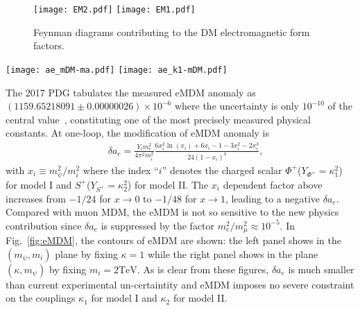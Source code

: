 \documentclass[aps,prd,letterpaper,showpacs,twocolumn,preprintnumbers,floatfix,superscriptaddress]{revtex4-1}
\begin{document}
%
\begin{figure}[t]
\centering
  \texttt{[image: EM2.pdf]}
  \texttt{[image: EM1.pdf]}
\caption{\label{ddloopgamma} Feynman diagrams contributing to the DM electromagnetic form factors.}
\end{figure}
%

\begin{figure*}[t!]
\centering
  \texttt{[image: ae\_mDM-ma.pdf]}
  \hspace{1cm}
  \texttt{[image: ae\_k1-mDM.pdf]}
  \caption{\label{fig:eMDM}The left plot shows eMDM for fixed $\kappa_1=1$ or $\kappa_2=1$ in the plane of DM 
  mass($m_{\psi}$) and charged scalar mass $m_i$. The right plot fixes $m_i=2\text{TeV}$ and shows
  the contours of $\delta a_e$ in the plane of the DM mass and the coupling $\kappa_1$ or $\kappa_2$, 
collectively denoted as $\kappa$ here.
}
\end{figure*}
%
The 2017 PDG tabulates the measured eMDM anomaly as $(1159.65218091\pm 0.00000026)\times 10^{-6}$ where 
the uncertainty is only $10^{-10}$ of
the central value~\cite{Patrignani:2016xqp}, constituting one of the most precisely measured physical constants. 
At one-loop, the modification of eMDM anomaly is
\begin{eqnarray}
  &&  \delta a_e = 
  \frac{Y_i m_e^2}{4\pi^2 m_i^2}
   \frac{6 x_i^2 \ln(x_i) + 6 x_i -1 - 3 x_i^2 - 2 x_i^3}{24 (1-x_i)^4} ,  \  \
\end{eqnarray}
%
with $x_i \equiv m^2_{\psi}/m_i^2$ where the index ``$i$'' denotes the charged scalar 
$\Phi^+$($Y_{\Phi^+}=\kappa_1^2$) for model I and $S^+$($Y_{S^+}=\kappa_2^2$) for model II.
The $x_i$ dependent factor above increases from $-1/24$ for $x\rightarrow 0$ to $-1/48$ for $x\rightarrow 1$,
leading to a negative $\delta a_e$.
%
Compared with muon MDM, the eMDM is not so sensitive to the new physics contribution since 
$\delta a_e$ is suppressed by the factor $m_e^2/m_{\mu}^2 \approx 10^{-5}$. 
%
In Fig.~\ref{fig:eMDM}, the 
contours of eMDM are shown: the left panel shows in the $(m_{\psi}, m_i)$ plane by fixing $\kappa=1$ while 
the right panel shows in the plane $(\kappa, m_{\psi})$ by fixing $m_i=2\text{TeV}$.
%
As is clear from these
figures, $\delta a_e$ is much smaller than current experimental un-certaintity and eMDM imposes no severe
constraint on the couplings $\kappa_1$ for model I and $\kappa_2$ for model II.
\end{document}
